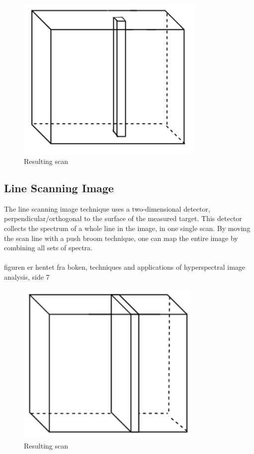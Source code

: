 

\begin{figure}[H]
\centering
  \includegraphics[height=8cm]{Images/theory/voxel.png}
  \caption{Resulting scan}
  \label{fig:voxel2}
\end{figure}


\subsection{Line Scanning Image}
The line scanning image technique uses a two-dimensional detector, perpendicular/orthogonal to the surface of the measured target. This detector collects the spectrum of a whole line in the image, in one single scan. By moving the scan line with a push broom technique, one can map the entire image by combining all sets of spectra.
\\\\
figuren er hentet fra boken, techniques and applications of hyperspectral image analysis, side 7


\begin{figure}[H]
\centering
  \includegraphics[height=8cm]{Images/theory/pushbroom.png}
  \caption{Resulting scan}
  \label{fig:pushbroom}
\end{figure}


